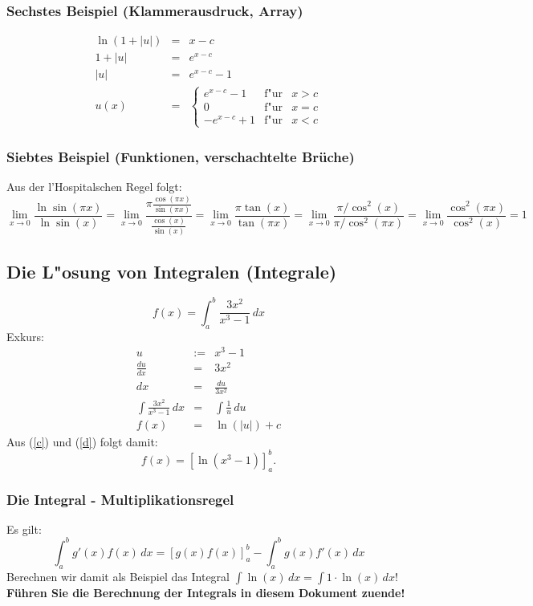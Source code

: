 \documentclass[a4paper,11pt]{article}
\begin{document}
\subsubsection{Sechstes Beispiel (Klammerausdruck, Array)}
\begin{eqnarray}
  \ln(1+|u|) & = &x-c \nonumber \\
  1+|u| & = & e^{x-c} \nonumber \\
  |u| & = & e^{x-c}-1 \nonumber \\
  u(x) & = & \left\{ \begin{array}{rcl}
                    e^{x-c}-1 & \mbox{f"ur} & x>c \\
                    0         & \mbox{f"ur} & x=c \\
                    -e^{x-c}+1 & \mbox{f"ur} & x<c
                    \end{array}\right.
\end{eqnarray}
\subsubsection{Siebtes Beispiel (Funktionen, verschachtelte Br\"uche)}
Aus der l'Hospitalschen Regel folgt:
\[
\lim_{x\to 0} \frac{\ln\sin(\pi x)}{\ln\sin(x)}=
\lim_{x\to 0} \frac{\pi\frac{\cos(\pi x)}{\sin(\pi x)}}{\frac{\cos(x)}{\sin(x)}}=
\lim_{x\to 0} \frac{\pi \tan(x)}{\tan(\pi x)}=
\lim_{x\to 0} \frac{\pi/\cos^2(x)}{\pi/\cos^2(\pi x)}=
\lim_{x\to 0} \frac{\cos^2(\pi x)}{\cos^2(x)}=1
\]
%
\subsection{Die L"osung von Integralen (Integrale)}
\begin{equation}
\label{c}
  f(x) = \int^b_a \frac{3x^2}{x^3-1}\,dx
\end{equation}
Exkurs:
\begin{eqnarray}
  u & := & x^3-1 \nonumber \\
  \frac{du}{dx} & = & 3x^2 \nonumber \\
  dx & = & \frac{du}{3x^2} \nonumber \\
  \int\frac{3x^2}{x^3-1}\, dx & = & \int \frac 1u\, du \\
  f(x) & = & \ln(|u|)+c \label{d}
\end{eqnarray}
Aus (\ref{c}) und (\ref{d}) folgt damit:
\[
f(x)=[\ln(x^3-1)]^b_a.
\]
\subsubsection{Die Integral - Multiplikationsregel}
Es gilt:
\[
  \int^b_a g'(x)f(x)\,dx = \left[g(x)f(x)\right]^b_a - \int^b_a g(x)f'(x)\,dx
\]
Berechnen wir damit als Beispiel das Integral $\int \ln(x)\, dx = \int 1\cdot \ln(x)\, dx$!\\
\textbf{F\"uhren Sie die Berechnung der Integrals in diesem Dokument zuende!}
%
\end{document}
